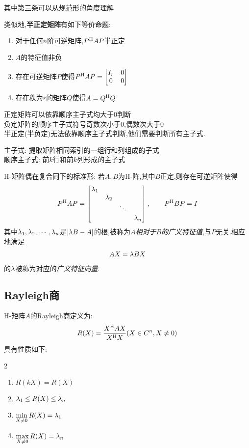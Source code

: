 \documentclass{matrix-review}
\makeatletter
\newcommand{\term}[1]{\textbf{#1}\index{A#1@#1}}
\makeatother
\begin{document}
\begin{remarkbox}
    其中第三条可以从规范形的角度理解
\end{remarkbox}

类似地,\term{半正定矩阵}有如下等价命题:
\begin{enumerate}
    \item 对于任何$n$阶可逆矩阵,$P^{\mathrm{H}} AP$半正定
    \item $A$的特征值非负
    \item 存在可逆矩阵$P$使得$P^{\mathrm{H}} AP=\begin{bmatrix}I_r&0\\0&0\end{bmatrix}$
    \item 存在秩为$r$的矩阵$Q$使得$A=Q^{\mathrm{H}} Q$
\end{enumerate}
\begin{remarkbox}
    正定矩阵可以依靠顺序主子式均大于0判断\\
    负定矩阵的顺序主子式符号奇数次小于0,偶数次大于0\\
    半正定(半负定)无法依靠顺序主子式判断,他们需要判断所有主子式.
    \begin{remarkbox}
        主子式: 提取矩阵相同索引的一组行和列组成的子式\\
        顺序主子式: 前$ k $行和前$ k $列形成的主子式
    \end{remarkbox}
\end{remarkbox}

H-矩阵偶在复合同下的标准形: 若$A,B$为H-阵,其中$B$正定,则存在可逆矩阵使得\begin{equation*}
    P^{\mathrm{H}} AP=\begin{bmatrix}\lambda_1\\&\lambda_2\\&&\ddots\\&&&\lambda_n\end{bmatrix},\qquad P^{\mathrm{H}} BP=I
\end{equation*}其中$\lambda_1,\lambda_2,\cdots,\lambda_n$是$|\lambda B-A|$的根,被称为\emph{$A$相对于$B$的广义特征值},与$P$无关.相应地满足\begin{equation*}
    AX=\lambda BX
\end{equation*}的$\lambda$被称为对应的\emph{广义特征向量}.


\subsection{Rayleigh商}
H-矩阵$A$的Rayleigh商定义为:\begin{equation}
    R(X)=\frac{X^{\mathrm{H}} AX}{X^{\mathrm{H}} X}(X\in C^n, X\ne0)
\end{equation}具有性质如下:
\begin{multicols}{2}
    \begin{enumerate}
        \item $R(kX)=R(X)$
        \item $\lambda_1\le R(X)\le\lambda_n$
        \item $\displaystyle\min_{X\ne0}R(X)=\lambda_1$
        \item $\displaystyle\max_{X\ne0}R(X)=\lambda_n$
    \end{enumerate}
\end{multicols}
\end{document}
